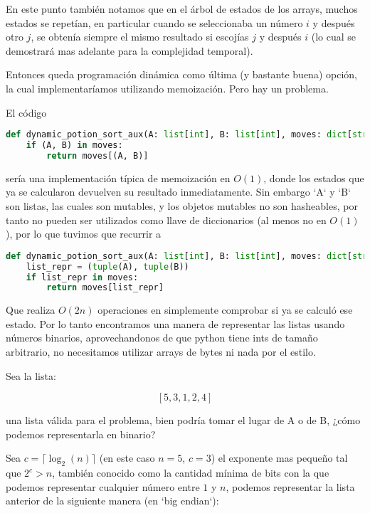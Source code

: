 \documentclass{article}
\begin{document}
En este punto también notamos que en el árbol de estados de los arrays, muchos estados se repetían, en particular cuando se seleccionaba un número $i$ y después otro $j$, se obtenía siempre el mismo resultado si escojías $j$ y después $i$ (lo cual se demostrará mas adelante para la complejidad temporal).

Entonces queda programación dinámica como última (y bastante buena) opción, la cual implementaríamos utilizando memoización. Pero hay un problema.

El código

\begin{lstlisting}[language=Python]
def dynamic_potion_sort_aux(A: list[int], B: list[int], moves: dict[str, list[int]]):
    if (A, B) in moves:
        return moves[(A, B)]
\end{lstlisting}

sería una implementación típica de memoización en $O(1)$, donde los estados que ya se calcularon devuelven su resultado inmediatamente.
Sin embargo `A` y `B` son listas, las cuales son mutables, y los objetos mutables no son hasheables, por tanto no pueden ser utilizados como llave de diccionarios (al menos no en $O(1)$), por lo que tuvimos que recurrir a

\begin{lstlisting}[language=Python]
def dynamic_potion_sort_aux(A: list[int], B: list[int], moves: dict[str, list[int]]):
    list_repr = (tuple(A), tuple(B))
    if list_repr in moves:
        return moves[list_repr]
\end{lstlisting}

Que realiza $O(2n)$ operaciones en simplemente comprobar si ya se calculó ese estado. Por lo tanto encontramos una manera de representar las listas usando números binarios, aprovechandonos de que python tiene ints de tamaño arbitrario, no necesitamos utilizar arrays de bytes ni nada por el estilo.

Sea la lista:

\[ [5, 3, 1, 2, 4] \]

una lista válida para el problema, bien podría tomar el lugar de A o de B, ¿cómo podemos representarla en binario?

Sea $c = \lceil \log_2(n) \rceil$ (en este caso $n = 5$, $c = 3$) el exponente mas pequeño tal que $2^c > n$, también conocido como la cantidad mínima de bits con la que podemos representar cualquier número entre $1$ y $n$, podemos representar la lista anterior de la siguiente manera (en `big endian`):
\end{document}
